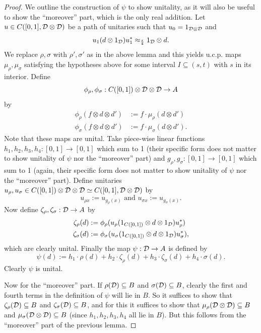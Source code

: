 \documentclass[12pt]{amsart}
\begin{document}
\begin{lemma}
\begin{proof}
We outline the construction of $\psi$ to show unitality, as it will also be useful to show the ``moreover'' part, which is the only real addition. Let $u \in C([0,1],\mathcal{D} \otimes \mathcal{D})$ be a path of unitaries such that $u_0 = 1_{\mathcal{D} \otimes \mathcal{D}}$ and
\begin{equation}
u_1(d \otimes 1_{\mathcal{D}})u_1^* \approx_{\frac{\varepsilon}{4}} 1_{\mathcal{D}} \otimes d. 
\end{equation}
We replace $\rho,\sigma$ with $\rho',\sigma'$ as in the above lemma and this yields u.c.p. maps $\mu_\rho,\mu_\sigma$ satisfying the hypotheses above for some interval $I \subseteq (s,t)$ with $s$ in its interior. Define
\begin{equation}
\phi_\rho,\phi_\sigma: C([0,1]) \otimes \mathcal{D} \otimes \mathcal{D} \to A
\end{equation}
by
\begin{equation}
\begin{split}
\phi_\rho(f \otimes d \otimes d') &:= f\cdot \mu_\rho(d \otimes d') \\
\phi_\sigma(f \otimes d \otimes d') &:= f\cdot \mu_\sigma(d \otimes d'). 
\end{split}
\end{equation}
Note that these maps are unital. Take piece-wise linear functions $h_1,h_2,h_3,h_4: [0,1] \to [0,1]$ which sum to 1 (their specific form does not matter to show unitality of $\psi$ nor the ``moreover'' part) and  $g_\rho,g_\sigma: [0,1] \to [0,1]$ which sum to 1 (again, their specific form does not matter to show unitality of $\psi$ nor the ``moreover'' part). Define unitaries $u_\rho,u_\sigma \in C([0,1]) \otimes \mathcal{D} \otimes \mathcal{D} \simeq C([0,1],\mathcal{D} \otimes \mathcal{D})$ by 
\begin{equation}
u_{\rho x} := u_{g_\rho(x)} \text{ and } u_{\sigma x} := u_{g_\sigma(x)}.
\end{equation}
Now define $\zeta_\rho,\zeta_\sigma: \mathcal{D} \to A$ by
\begin{equation}
\begin{split}
\zeta_\rho(d) &:=  \phi_\rho(u_\rho(1_{C([0,1])} \otimes d \otimes 1_{\mathcal{D}})u_\rho^*) \\
\zeta_\sigma(d) &:= \phi_\sigma(u_\sigma(1_{C([0,1])} \otimes d \otimes 1_{\mathcal{D}})u_\sigma^*),
\end{split}
\end{equation}
which are clearly unital. Finally the map $\psi: \mathcal{D} \to A$ is defined by
\begin{equation}
\psi(d) := h_1\cdot\rho(d) + h_2\cdot \zeta_\rho(d) + h_3\cdot \zeta_\sigma(d) + h_4\cdot \sigma(d).
\end{equation}
Clearly $\psi$ is unital. 

Now for the ``moreover'' part. If $\rho(\mathcal{D}) \subseteq B$ and $\sigma(\mathcal{D}) \subseteq B$, clearly the first and fourth terms in the definition of $\psi$ will lie in $B$. So it suffices to show that $\zeta_\rho(\mathcal{D}) \subseteq B$ and $\zeta_\sigma(\mathcal{D}) \subseteq B$, and for this it suffices to show that $\mu_\rho(\mathcal{D} \otimes \mathcal{D}) \subseteq B$ and $\mu_\sigma(\mathcal{D} \otimes \mathcal{D}) \subseteq B$ (since $h_1,h_2,h_3,h_4$ all lie in $B$). But this follows from the ``moreover'' part of the previous lemma. 
\end{proof}
\end{lemma}
\end{document}
